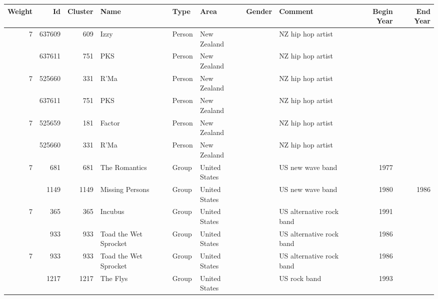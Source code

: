 \begin{tabular}{|r|rrlllllrr|}
\hline
   Weight &     Id &   Cluster & Name                  & Type   & Area           & Gender   & Comment                             &   Begin Year &   End Year \\
\hline
\multirow{2}{*}{7} & 637609 &       609 & Izzy                  & Person & New Zealand    &          & NZ hip hop artist                   &              &            \\
          & 637611 &       751 & PKS                   & Person & New Zealand    &          & NZ hip hop artist                   &              &            \\
\hline
\multirow{2}{*}{7} & 525660 &       331 & R'Ma                  & Person & New Zealand    &          & NZ hip hop artist                   &              &            \\
          & 637611 &       751 & PKS                   & Person & New Zealand    &          & NZ hip hop artist                   &              &            \\
\hline
\multirow{2}{*}{7} & 525659 &       181 & Factor                & Person & New Zealand    &          & NZ hip hop artist                   &              &            \\
          & 525660 &       331 & R'Ma                  & Person & New Zealand    &          & NZ hip hop artist                   &              &            \\
\hline
\multirow{2}{*}{7} &    681 &       681 & The Romantics         & Group  & United States  &          & US new wave band                    &         1977 &            \\
         &   1149 &      1149 & Missing Persons       & Group  & United States  &          & US new wave band                    &         1980 &       1986 \\
\hline
\multirow{2}{*}{7} &    365 &       365 & Incubus               & Group  & United States  &          & US alternative rock band            &         1991 &            \\
         &    933 &       933 & Toad the Wet Sprocket & Group  & United States  &          & US alternative rock band            &         1986 &            \\
\hline
\multirow{2}{*}{7} &    933 &       933 & Toad the Wet Sprocket & Group  & United States  &          & US alternative rock band            &         1986 &            \\
         &   1217 &      1217 & The Flys              & Group  & United States  &          & US rock band                        &         1993 &            \\

\end{tabular}
